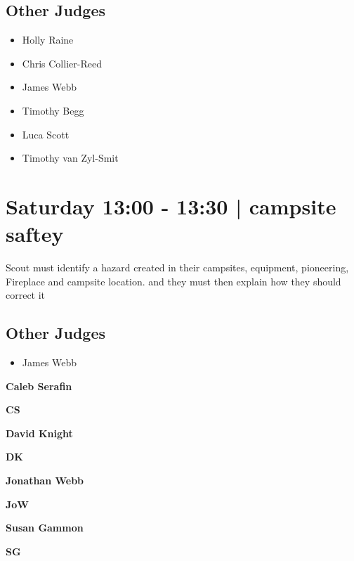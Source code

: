 \documentclass[10pt]{article}
\newcommand{\newtitle}[1]{\begin{center}{\Huge\bfseries #1 }\\ \vspace{5mm}\end{center}}
\newcommand{\newsubtitle}[1]{\begin{center}{\color{grey}\Large\bfseries #1 }\\ \vspace{5mm}\end{center}}
\begin{document}
        \subsection*{Other Judges}
        
            \begin{itemize}
                            \item Holly Raine
                            \item Chris Collier-Reed
                            \item James Webb
                            \item Timothy Begg
                            \item Luca Scott
                            \item Timothy van Zyl-Smit
                        \end{itemize}
        

            \section*{Saturday 13:00
        -
        13:30
        |
         campsite saftey}
        
                            Scout must identify a hazard created in their campsites, equipment, pioneering, Fireplace and campsite location. and they must then explain how they should correct it
        
        \subsection*{Other Judges}
        
            \begin{itemize}
                            \item James Webb
                        \end{itemize}
        

    
	\clearpage

		\newtitle{Caleb Serafin}
	\newsubtitle{CS}

    
	\clearpage

		\newtitle{David Knight}
	\newsubtitle{DK}

    
	\clearpage

		\newtitle{Jonathan Webb}
	\newsubtitle{JoW}

    
	\clearpage

		\newtitle{Susan Gammon}
	\newsubtitle{SG}
\end{document}

